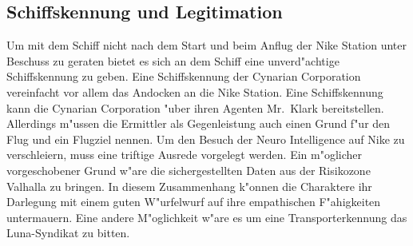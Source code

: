 \subsection{Schiffskennung und Legitimation}
Um mit dem Schiff nicht nach dem Start und beim Anflug der Nike Station unter Beschuss zu geraten bietet es sich an dem Schiff eine unverd"achtige Schiffskennung zu geben. Eine Schiffskennung der Cynarian Corporation vereinfacht vor allem das Andocken an die Nike Station. Eine Schiffskennung kann die Cynarian Corporation "uber ihren Agenten Mr.~Klark bereitstellen. Allerdings m"ussen die Ermittler als Gegenleistung auch einen Grund f"ur den Flug und ein Flugziel nennen. Um den Besuch der Neuro Intelligence auf Nike zu verschleiern, muss eine triftige Ausrede vorgelegt werden. Ein m"oglicher vorgeschobener Grund w"are die sichergestellten Daten aus der Risikozone Valhalla zu bringen. In diesem Zusammenhang k"onnen die Charaktere ihr Darlegung mit einem guten W"urfelwurf auf ihre empathischen F"ahigkeiten untermauern. Eine andere M"oglichkeit w"are es um eine Transporterkennung das Luna-Syndikat zu bitten.
